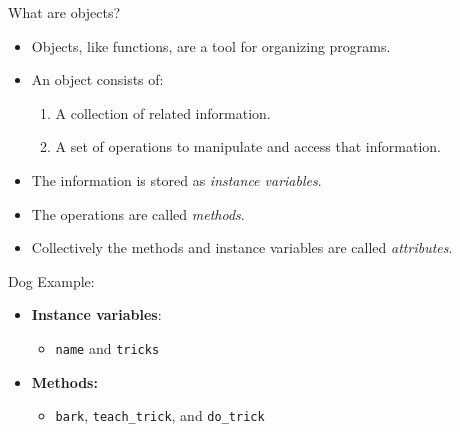 \documentclass[serif,xcolor=pdftex,dvipsnames,table,hyperref={bookmarks=false,breaklinks}]{beamer}
\begin{document}
\begin{frame}[t,fragile]{What are objects?}
	\begin{itemize}[<+->]
		\item Objects, like functions, are a tool for organizing programs.
		\item An object consists of:
		\begin{enumerate}[<+->]
			\item A collection of related information.
			\item A set of operations to manipulate and access that information.
		\end{enumerate}
		\item The information is stored as \textit{instance variables}.
		\item The operations are called \textit{methods}.
		\item Collectively the methods and instance variables are called \textit{attributes}.
	\end{itemize}
	
	\pause
	\begin{block}{Dog Example:}
		\begin{itemize}[<+->]
			\item \textbf{Instance variables}:
			\begin{itemize}[<+->]
				\item \verb|name| and \verb|tricks|
			\end{itemize}
			\item \textbf{Methods:}
			\begin{itemize}[<+->]
				\item \verb|bark|, \verb|teach_trick|, and \verb|do_trick|
			\end{itemize}
		\end{itemize}
	\end{block}
	
\end{frame}

%
%
\end{document}
